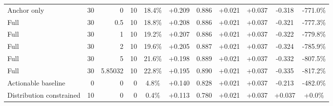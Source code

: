 \begin{table}[htbp]
\begin{tabular}{lrrrccccccc}
Anchor only & 30 & 0 & 10 & 18.4\% & +0.209 & 0.886 & +0.021 & +0.037 & -0.318 & -771.0\% \\
Full & 30 & 0.5 & 10 & 18.8\% & +0.208 & 0.886 & +0.021 & +0.037 & -0.321 & -777.3\% \\
Full & 30 & 1 & 10 & 19.2\% & +0.207 & 0.886 & +0.021 & +0.037 & -0.322 & -779.8\% \\
Full & 30 & 2 & 10 & 19.6\% & +0.205 & 0.887 & +0.021 & +0.037 & -0.324 & -785.9\% \\
Full & 30 & 5 & 10 & 21.6\% & +0.198 & 0.889 & +0.021 & +0.037 & -0.332 & -807.5\% \\
Full & 30 & 5.85032 & 10 & 22.8\% & +0.195 & 0.890 & +0.021 & +0.037 & -0.335 & -817.2\% \\
Actionable baseline & 0 & 0 & 0 & 4.8\% & +0.140 & 0.828 & +0.021 & +0.037 & -0.213 & -482.0\% \\
Distribution constrained & 10 & 0 & 0 & 0.4\% & +0.113 & 0.780 & +0.021 & +0.037 & +0.037 & +0.0\% \\
\bottomrule
\end{tabular}
\end{table}